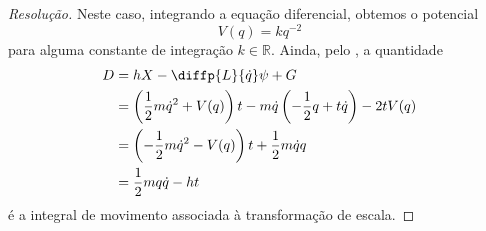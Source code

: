 \begin{proof}[Resolução]
    Neste caso, integrando a equação diferencial, obtemos o potencial
    \begin{equation*}
        V(q) = kq^{-2}
    \end{equation*}
    para alguma constante de integração \(k \in \mathbb{R}\). Ainda, pelo , a quantidade
    \begin{align*}
        D &= hX - \diffp{L}{\dot{q}}\psi + G\\
          &= \left(\frac12 m\dot{q}^2 + V(q)\right)t - m\dot{q}\left(-\frac{1}{2}q + t\dot{q}\right) - 2t V(q)\\
          &= \left(-\frac12 m\dot{q}^2 - V(q)\right)t + \frac12m\dot{q}q\\
          &= \frac12 mq\dot{q}-ht
    \end{align*}
    é a integral de movimento associada à transformação de escala.
\end{proof}
